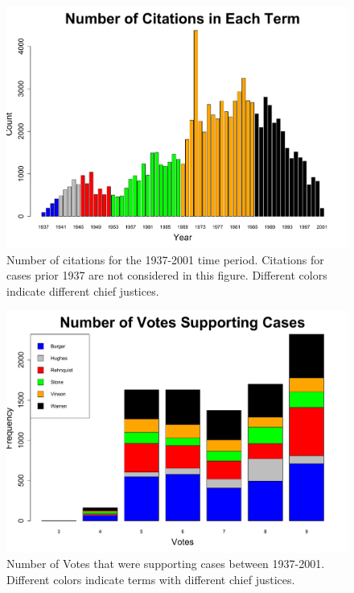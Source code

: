 \documentclass[headsepline=true, abstracton]{scrartcl}
\begin{document}
 \begin{figure}[H]
\includegraphics[scale=0.5]{number_citations}
\caption{Number of citations for the 1937-2001 time period. Citations for cases prior 1937 are not considered in this figure. Different colors indicate different chief justices.}
 \label{number_citations}
\vspace{-.25cm}
\end{figure}  
  
  \begin{figure}[H]
\includegraphics[scale=0.5]{number_votes_supporting}
\caption{Number of Votes that were supporting cases between 1937-2001. Different colors indicate terms with different chief justices. }
 \label{number_supporting}
\vspace{-.25cm}
\end{figure}  
  
\end{document}
